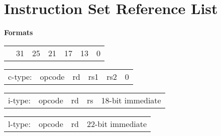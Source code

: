 \documentclass{article}
\begin{document}
\section{Instruction Set Reference List}
\bigskip

\begin{minipage}[t]{0.3\textwidth}
	\begin{center}
		\medskip
		\textbf{Formats}
	\end{center}
\end{minipage}
\begin{minipage}[t]{110mm}
	\begin{tabular}{p{12mm}p{15mm}p{10mm}p{10mm}p{10mm}p{22.5mm}R{22.5mm}}
		& 31 & 25 & 21 & 17 & 13 & 0 \\ 
	\end{tabular} 

	\begin{tabular}{p{12mm}|C{15mm}|C{10mm}|C{10mm}|C{10mm}|C{45mm}|}
		c-type: & opcode & rd & rs1 & rs2 & 0\\ 
	\end{tabular} 
	
	\medskip

	\begin{tabular}{p{12mm}|C{15mm}|C{10mm}|C{10mm}|C{55.15mm}|}
		i-type: & opcode & rd & rs & 18-bit immediate \\
	\end{tabular}

	\medskip
	
	\begin{tabular}{p{12mm}|C{15mm}|C{10mm}|C{65.3mm}|}
		l-type: & opcode & rd & 22-bit immediate \\
	\end{tabular}
	

\end{minipage}

\bigskip\bigskip\bigskip
\end{document}

